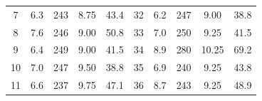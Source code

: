 \documentclass[12pt,B5paper,]{book}
\begin{document}
\begin{table}[H]
\begin{tabular}{ccccc|ccccc}
7                    & 6.3                                                      & 243                                                       & 8.75                                                      & 43.4                                                     & 32                   & 6.2                                                      & 247                                                       & 9.00                                                      & 38.8                                                     \\
8                    & 7.6                                                      & 246                                                       & 9.00                                                      & 50.8                                                     & 33                   & 7.0                                                      & 250                                                       & 9.25                                                      & 41.5                                                     \\
9                    & 6.4                                                      & 249                                                       & 9.00                                                      & 41.5                                                     & 34                   & 8.9                                                      & 280                                                       & 10.25                                                     & 69.2                                                     \\
10                   & 7.0                                                      & 247                                                       & 9.50                                                      & 38.8                                                     & 35                   & 6.9                                                      & 240                                                       & 9.25                                                      & 43.8                                                     \\
11                   & 6.6                                                      & 237                                                       & 9.75                                                      & 47.1                                                     & 36                   & 8.7                                                      & 243                                                       & 9.25                                                      & 48.9                                                     \\

\end{tabular}
\end{table}
\end{document}
